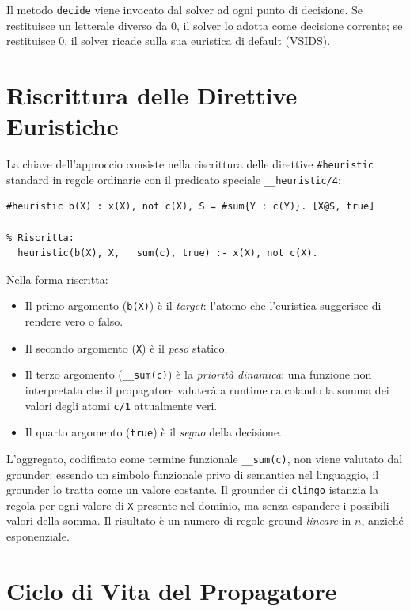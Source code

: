 \documentclass[a4paper,12pt,twoside,openright]{report}
\newcommand{\clingo}{\texttt{clingo}}
\newcommand{\vsids}{\textsc{VSIDS}}
\begin{document}
Il metodo \texttt{decide} viene invocato dal solver ad ogni punto di decisione. Se restituisce un letterale diverso da $0$, il solver lo adotta come decisione corrente; se restituisce $0$, il solver ricade sulla sua euristica di default (\vsids{}).

\section{Riscrittura delle Direttive Euristiche}
\label{sec:riscrittura}

La chiave dell'approccio consiste nella riscrittura delle direttive \texttt{\#heuristic} standard in regole ordinarie con il predicato speciale \texttt{\_\_heuristic/4}:

\begin{lstlisting}[caption={Trasformazione della direttiva euristica}]
% Originale:
#heuristic b(X) : x(X), not c(X), S = #sum{Y : c(Y)}. [X@S, true]

% Riscritta:
__heuristic(b(X), X, __sum(c), true) :- x(X), not c(X).
\end{lstlisting}

Nella forma riscritta:
\begin{itemize}
    \item Il primo argomento (\texttt{b(X)}) \`{e} il \emph{target}: l'atomo che l'euristica suggerisce di rendere vero o falso.
    \item Il secondo argomento (\texttt{X}) \`{e} il \emph{peso} statico.
    \item Il terzo argomento (\texttt{\_\_sum(c)}) \`{e} la \emph{priorit\`{a} dinamica}: una funzione non interpretata che il propagatore valuter\`{a} a runtime calcolando la somma dei valori degli atomi \texttt{c/1} attualmente veri.
    \item Il quarto argomento (\texttt{true}) \`{e} il \emph{segno} della decisione.
\end{itemize}

L'aggregato, codificato come termine funzionale \texttt{\_\_sum(c)}, non viene valutato dal grounder: essendo un simbolo funzionale privo di semantica nel linguaggio, il grounder lo tratta come un valore costante. Il grounder di \clingo{} istanzia la regola per ogni valore di \texttt{X} presente nel dominio, ma senza espandere i possibili valori della somma. Il risultato \`{e} un numero di regole ground \emph{lineare} in $n$, anzich\'{e} esponenziale.

\section{Ciclo di Vita del Propagatore}
\label{sec:ciclo_vita}
\end{document}
